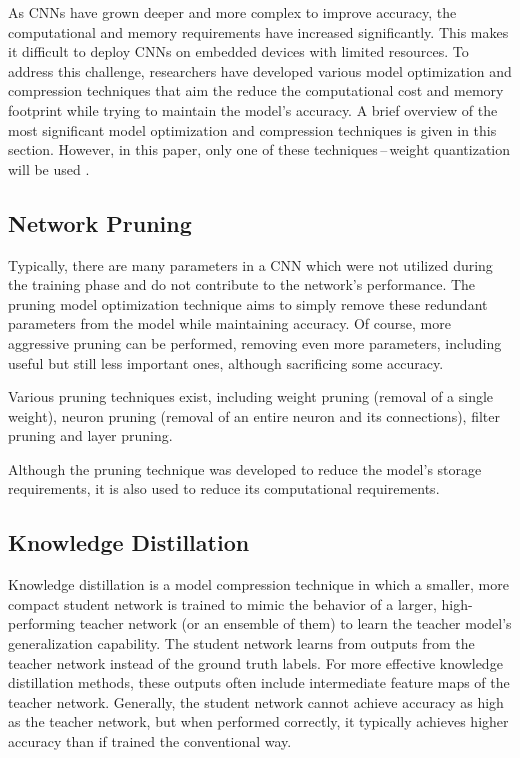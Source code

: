 As CNNs have grown deeper and more complex to improve accuracy, the
computational and memory requirements have increased significantly. This makes
it difficult to deploy CNNs on embedded devices with limited resources. To
address this challenge, researchers have developed various model optimization
and compression techniques that aim the reduce the computational cost and memory
footprint while trying to maintain the model's accuracy. A brief overview of the
most significant model optimization and compression techniques is given in this
section. However, in this paper, only one of these techniques\,--\,weight
quantization will be used .


\subsection{Network Pruning}

Typically, there are many parameters in a CNN which were not utilized during the
training phase and do not contribute to the network's performance. The pruning
model optimization technique aims to simply remove these redundant parameters
from the model while maintaining accuracy. Of course, more aggressive pruning
can be performed, removing even more parameters, including useful but still less
important ones, although sacrificing some accuracy.

Various pruning techniques exist, including weight pruning (removal of a single
weight), neuron pruning (removal of an entire neuron and its connections),
filter pruning and layer pruning.

Although the pruning technique was developed to reduce the model's storage
requirements, it is also used to reduce its computational requirements.



\subsection{Knowledge Distillation}

Knowledge distillation is a model compression technique in which a smaller, more
compact student network is trained to mimic the behavior of a larger,
high-performing teacher network (or an ensemble of them) to learn the teacher
model's generalization capability. The student network learns from outputs from
the teacher network instead of the ground truth labels. For more effective
knowledge distillation methods, these outputs often include intermediate feature
maps of the teacher network. Generally, the student network cannot achieve
accuracy as high as the teacher network, but when performed correctly, it
typically achieves higher accuracy than if trained the conventional way.


